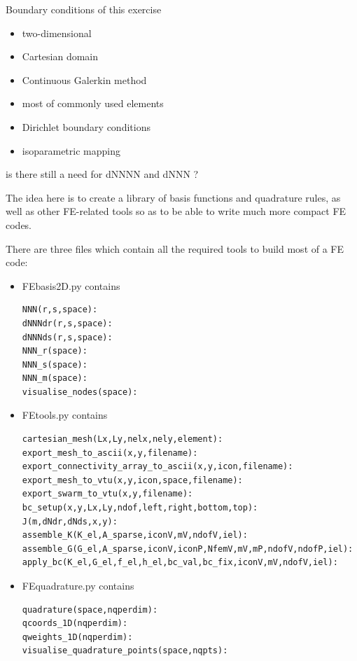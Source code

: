 
Boundary conditions of this exercise
\begin{itemize}
\item two-dimensional
\item Cartesian domain
\item Continuous Galerkin method
\item most of commonly used elements 
\item Dirichlet boundary conditions
\item isoparametric mapping
\end{itemize}



is there still a need for dNNNN and dNNN ?


The idea here is to create a library of basis functions and quadrature rules, as well as 
other FE-related tools so as to be able to write much more compact FE codes. 

There are three files which contain all the required tools to build most of a FE code:

\begin{itemize}

\item {\pythonfile FEbasis2D.py} contains 
\begin{lstlisting}
NNN(r,s,space):
dNNNdr(r,s,space):
dNNNds(r,s,space):
NNN_r(space):
NNN_s(space):
NNN_m(space):
visualise_nodes(space):
\end{lstlisting}



\item {\pythonfile FEtools.py} contains

\begin{lstlisting}
cartesian_mesh(Lx,Ly,nelx,nely,element):
export_mesh_to_ascii(x,y,filename):
export_connectivity_array_to_ascii(x,y,icon,filename):
export_mesh_to_vtu(x,y,icon,space,filename):
export_swarm_to_vtu(x,y,filename):
bc_setup(x,y,Lx,Ly,ndof,left,right,bottom,top):
J(m,dNdr,dNds,x,y):
assemble_K(K_el,A_sparse,iconV,mV,ndofV,iel):
assemble_G(G_el,A_sparse,iconV,iconP,NfemV,mV,mP,ndofV,ndofP,iel):
apply_bc(K_el,G_el,f_el,h_el,bc_val,bc_fix,iconV,mV,ndofV,iel):
\end{lstlisting}

\item {\pythonfile FEquadrature.py} contains

\begin{lstlisting}
quadrature(space,nqperdim):
qcoords_1D(nqperdim):
qweights_1D(nqperdim):
visualise_quadrature_points(space,nqpts):
\end{lstlisting}

\end{itemize}

